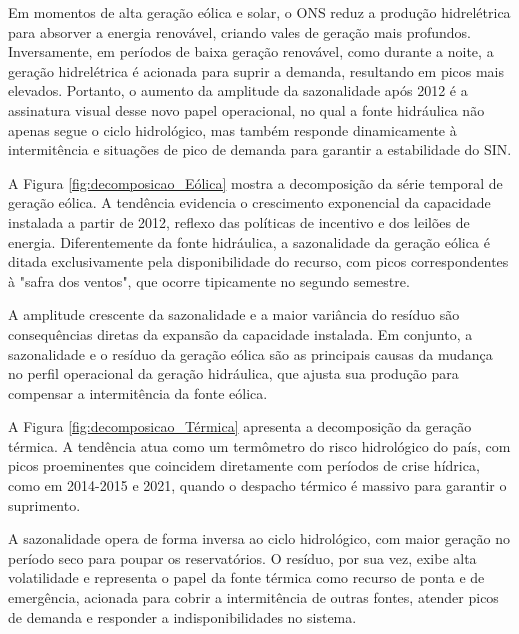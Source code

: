Em momentos de alta geração eólica e solar, o ONS reduz a produção hidrelétrica para absorver a energia renovável, criando vales 
de geração mais profundos. Inversamente, em períodos de baixa geração renovável, como durante a noite, a geração hidrelétrica 
é acionada para suprir a demanda, resultando em picos mais elevados. Portanto, o aumento da amplitude da sazonalidade após 
2012 é a assinatura visual desse novo papel operacional, no qual a fonte hidráulica não apenas segue o ciclo hidrológico, 
mas também responde dinamicamente à intermitência e situações de pico de demanda para garantir a estabilidade do SIN. \cite{Wang2025}

A Figura \ref{fig:decomposicao_Eólica} mostra a decomposição da série temporal de geração eólica. A tendência
evidencia o crescimento exponencial da capacidade instalada a partir de 2012, reflexo das políticas de incentivo e dos leilões 
de energia. Diferentemente da fonte hidráulica, a sazonalidade da geração eólica é ditada exclusivamente 
pela disponibilidade do recurso, com picos correspondentes à "safra dos ventos", que ocorre tipicamente no segundo semestre. 

A amplitude crescente da sazonalidade e a maior variância do resíduo são consequências diretas da expansão 
da capacidade instalada. Em conjunto, a sazonalidade e o resíduo da geração eólica são as principais causas da mudança no 
perfil operacional da geração hidráulica, que ajusta sua produção para compensar a intermitência da fonte eólica.

\begin{figure}[!ht]
  {}
  {}
\end{figure}

A Figura \ref{fig:decomposicao_Térmica} apresenta a decomposição da geração térmica. A tendência atua 
como um termômetro do risco hidrológico do país, com picos proeminentes que coincidem diretamente com períodos de crise hídrica, 
como em 2014-2015 e 2021, quando o despacho térmico é massivo para garantir o suprimento. 

A sazonalidade opera de forma inversa ao ciclo hidrológico, com maior geração no período seco para poupar os reservatórios. 
O resíduo, por sua vez, exibe alta volatilidade e representa o papel da fonte térmica como recurso de ponta e de emergência, 
acionada para cobrir a intermitência de outras fontes, atender picos de demanda e responder a indisponibilidades no sistema. 


